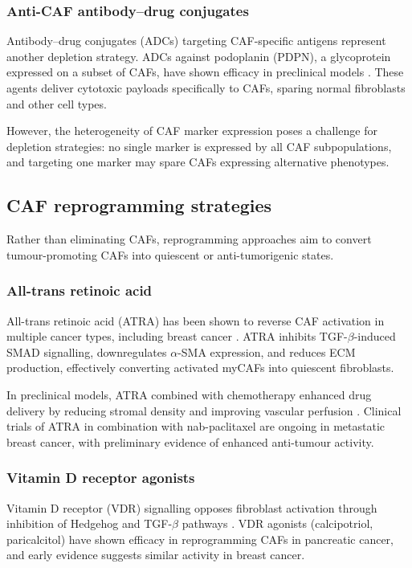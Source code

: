 \subsubsection{Anti-CAF antibody--drug conjugates}

Antibody--drug conjugates (ADCs) targeting CAF-specific antigens represent another depletion strategy. ADCs against podoplanin (PDPN), a glycoprotein expressed on a subset of CAFs, have shown efficacy in preclinical models \citep{ueji2023}. These agents deliver cytotoxic payloads specifically to CAFs, sparing normal fibroblasts and other cell types.

However, the heterogeneity of CAF marker expression poses a challenge for depletion strategies: no single marker is expressed by all CAF subpopulations, and targeting one marker may spare CAFs expressing alternative phenotypes.

\subsection{CAF reprogramming strategies}

Rather than eliminating CAFs, reprogramming approaches aim to convert tumour-promoting CAFs into quiescent or anti-tumorigenic states.

\subsubsection{All-trans retinoic acid}

All-trans retinoic acid (ATRA) has been shown to reverse CAF activation in multiple cancer types, including breast cancer \citep{liu2023}. ATRA inhibits TGF-$\beta$-induced SMAD signalling, downregulates $\alpha$-SMA expression, and reduces ECM production, effectively converting activated myCAFs into quiescent fibroblasts.

In preclinical models, ATRA combined with chemotherapy enhanced drug delivery by reducing stromal density and improving vascular perfusion \citep{liu2023}. Clinical trials of ATRA in combination with nab-paclitaxel are ongoing in metastatic breast cancer, with preliminary evidence of enhanced anti-tumour activity.

\subsubsection{Vitamin D receptor agonists}

Vitamin D receptor (VDR) signalling opposes fibroblast activation through inhibition of Hedgehog and TGF-$\beta$ pathways \citep{shen2023}. VDR agonists (calcipotriol, paricalcitol) have shown efficacy in reprogramming CAFs in pancreatic cancer, and early evidence suggests similar activity in breast cancer.

